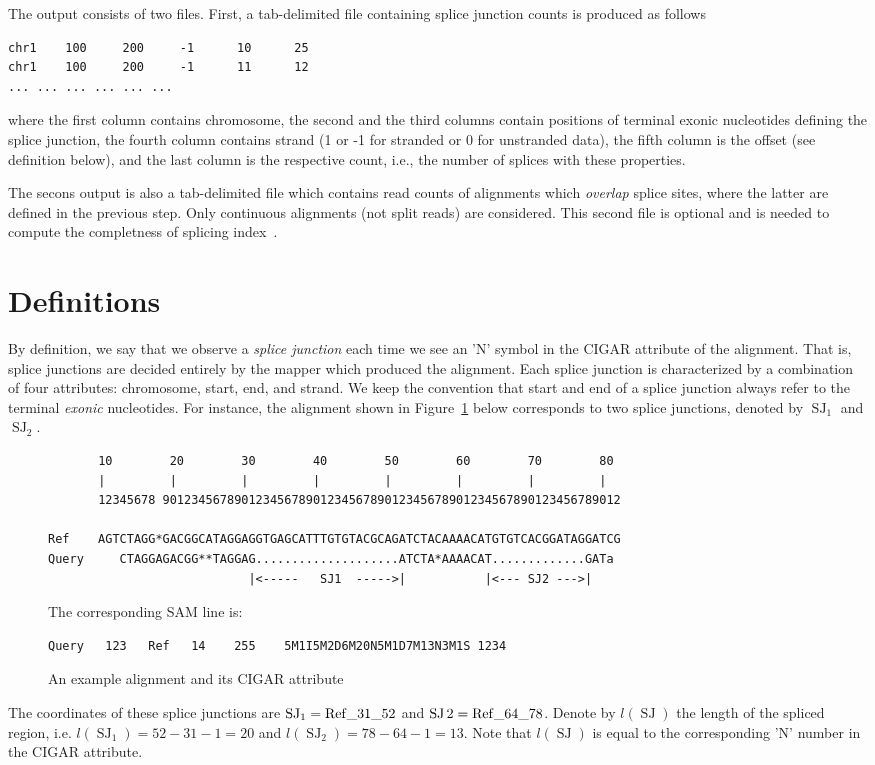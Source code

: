 \documentclass{article}
\DeclareMathOperator{\SJ}{SJ}
\begin{document}
The output consists of two files. First, a tab-delimited file containing splice junction counts is produced as follows
\begin{verbatim}
chr1    100     200     -1      10      25
chr1    100     200     -1      11      12
...	...	...	...	...	...
\end{verbatim}
where the first column contains chromosome, the second and the third columns contain positions of terminal exonic 
nucleotides defining the splice junction, the fourth column contains strand (1 or -1 for stranded or 0 for unstranded 
data), the fifth column is the offset (see definition below), and the last column is the respective count, i.e., the 
number of splices with these properties.

The secons output is also a tab-delimited file which contains read counts of alignments which {\em overlap} splice sites, 
where the latter are defined in the previous step. Only continuous alignments (not split reads) are considered. This second 
file is optional and is needed to compute the completness of splicing index~\cite{pmid23172860, pmid22955974}.

\section{Definitions}
By definition, we say that we observe a {\em splice junction} each time we see an 'N' symbol in the CIGAR attribute of 
the alignment. That is, splice junctions are decided entirely by the mapper which produced the alignment.
Each splice junction is characterized by a combination of four attributes: chromosome, start, end, and 
strand. We keep the convention that start and end of a splice junction always refer to the terminal {\it exonic}
nucleotides. For instance, the alignment shown in Figure~\ref{fig::01} below corresponds to two splice junctions,  
denoted by $\SJ_1$ and $\SJ_2$. 
%
\begin{figure}[h]
\footnotesize
\begin{verbatim}
       10        20        30        40        50        60        70        80
       |         |         |         |         |         |         |         |
       12345678 9012345678901234567890123456789012345678901234567890123456789012

Ref    AGTCTAGG*GACGGCATAGGAGGTGAGCATTTGTGTACGCAGATCTACAAAACATGTGTCACGGATAGGATCG
Query     CTAGGAGACGG**TAGGAG....................ATCTA*AAAACAT.............GATa
                            |<-----   SJ1  ----->|           |<--- SJ2 --->|
\end{verbatim}
The corresponding SAM line is:
\begin{verbatim}
Query   123   Ref   14    255    5M1I5M2D6M20N5M1D7M13N3M1S 1234 
\end{verbatim}
\caption{An example alignment and its CIGAR attribute\label{fig::01}}
\end{figure}
%
The coordinates of these splice junctions are $\SJ_1=\rm Ref\_31\_52$ and $\SJ2=\rm Ref\_64\_78$. Denote
by $l(\SJ)$ the length of the spliced region, i.e. $l(\SJ_1)=52-31-1=20$ and $l(\SJ_2)=78-64-1=13$. Note that
$l(\SJ)$ is equal to the corresponding 'N' number in the CIGAR attribute.
\end{document}
